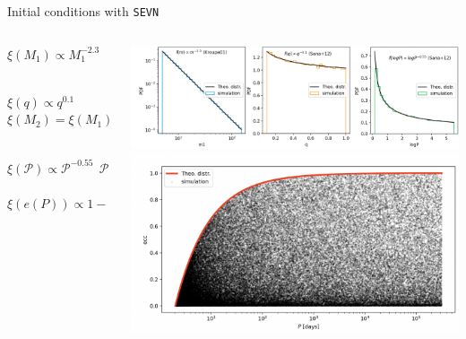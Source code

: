 \documentclass{beamer} %
\begin{document}
\begin{frame}[noframenumbering]{Initial conditions with \texttt{SEVN}}
	\scriptsize
		\begin{columns}
		\begin{column}{0.56\textwidth}
			\acapo
			$\boxed{\xi(M_1) \propto M_1^{-2.3}} \qquad \qquad ~~ M_1 \in [10,150]~M_\odot$\\
			\\
			\medskip
			\acapo
			
$\boxed{\xi(q) \propto q^{0.1}} \qquad \qquad \quad q=M_2/M_1 \in [0.1,1] $\\
\smallskip
$\xi(M_2) = \xi(M_1) \,{} \xi(q)  \qquad \qquad M_2 \in [1 ~M_\odot , M_1]$\\
\\
\medskip
			\acapo
			
$\boxed{\xi(\mathcal{P}) \propto \mathcal{P}^{-0.55}} ~~\mathcal{P} = \log(P/\text{days}) \in [0.30,5.5]$\\
\\
\medskip
			\acapo
$\boxed{\xi (e (P)) \propto 1-(P/\text{days})^{-2/3}} \qquad P \geq 2~\text{days}$\\
\smallskip
{}
		
		\end{column}
		\begin{column}{0.6\textwidth}
				\includegraphics[width=\textwidth]{./images/initialconditions.png}\\
				\bigskip
				\includegraphics[width=\textwidth]{./images/initialperiods.png}
		\end{column}
	\end{columns}
\end{frame}
\end{document}

